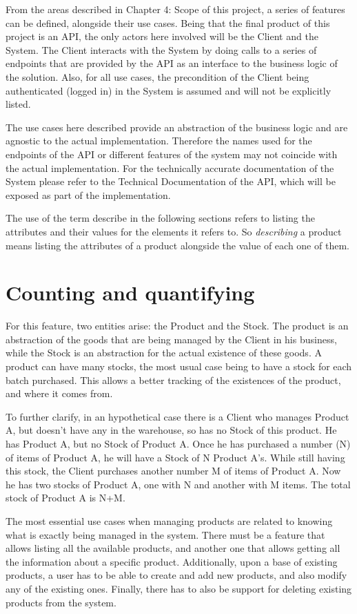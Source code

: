 From the areas described in Chapter 4: Scope of this project, a series of features can be defined, alongside their use cases. Being that the final product of this project is an API, the only actors here involved will be the Client and the System. The Client interacts with the System by doing calls to a series of endpoints that are provided by the API as an interface to the business logic of the solution. Also, for all use cases, the precondition of the Client being authenticated (logged in) in the System is assumed and will not be explicitly listed.

The use cases here described provide an abstraction of the business logic and are agnostic to the actual implementation. Therefore the names used for the endpoints of the API or different features of the system may not coincide with the actual implementation. For the technically accurate documentation of the System please refer to the Technical Documentation of the API, which will be exposed as part of the implementation.

The use of the term describe in the following sections refers to listing the attributes and their values for the elements it refers to. So \textit{describing} a product means listing the attributes of a product alongside the value of each one of them.

\section{Counting and quantifying}
For this feature, two entities arise: the Product and the Stock. The product is an abstraction of the goods that are being managed by the Client in his business, while the Stock is an abstraction for the actual existence of these goods. A product can have many stocks, the most usual case being to have a stock for each batch purchased. This allows a better tracking of the existences of the product, and where it comes from.

To further clarify, in an hypothetical case there is a Client who manages Product A, but doesn’t have any in the warehouse, so has no Stock of this product. He has Product A, but no Stock of Product A. Once he has purchased a number (N) of items of Product A, he will have a Stock of N Product A’s. While still having this stock, the Client purchases another number M of items of Product A. Now he has two stocks of Product A, one with N and another with M items. The total stock of Product A is N+M.

The most essential use cases when managing products are related to knowing what is exactly being managed in the system. There must be a feature that allows listing all the available products, and another one that allows getting all the information about a specific product. Additionally, upon a base of existing products, a user has to be able to create and add new products, and also modify any of the existing ones. Finally, there has to also be support for deleting existing products from the system.

